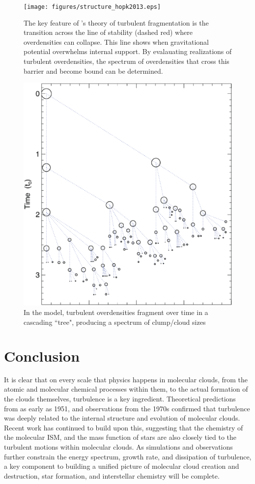 \documentclass[12pt, preprint]{aastex}
\begin{document}
\begin{figure}[H] 
	\centering
	\texttt{[image: figures/structure\_hopk2013.eps]}
	\caption{The key feature of \citet{hopk2013}'s theory of turbulent
		fragmentation is the transition across the line of stability (dashed
		red) where overdensities can collapse.  This line shows when
		gravitational potential overwhelms internal support.  By evalauating realizations of turbulent
		overdensities, the spectrum of overdensities that cross this barrier and
	become bound can be determined.}
\end{figure}

\begin{figure}[H] 
	\centering
	\includegraphics[scale=0.4]{figures/fragtree_hopk2013.eps}
	\caption{In the \citet{hopk2013} model, turbulent overdensities fragment
	over time in a cascading ``tree", producing a spectrum of clump/cloud sizes}
\end{figure}

\section{Conclusion}
It is clear that on every scale that physics happens in molecular clouds, from
the atomic and molecular chemical processes within them, to the actual formation
of the clouds themselves, turbulence is a key ingredient.  Theoretical
predictions from as early as 1951, and observations from the 1970s confirmed
that turbulence was deeply related to the internal structure and evolution of
molecular clouds.  Recent work has continued to build upon this, suggesting that
the chemistry of the molecular ISM, and the mass function of stars are also 
closely tied to the turbulent motions within molecular clouds.  As simulations
and observations further constrain the energy spectrum, growth rate, and
dissipation of turbulence, a key component to building a unified picture 
of molecular cloud creation and destruction, star formation, and interstellar 
chemistry will be complete.
\end{document}
